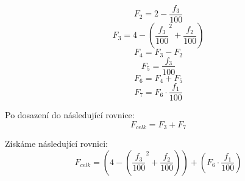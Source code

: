 \begin{equation}
    \label{eqn:1_calculation_7_1}
    F_2 = 2 - \frac{f_3}{100}
\end{equation}
\begin{equation}
    \label{eqn:2_calculation_7_1}
    F_3 = 4 - (\frac{f_3}{100}^2 + \frac{f_2}{100})
\end{equation}
\begin{equation}
    \label{eqn:3_calculation_7_1}
    F_4 = F_3 - F_2
\end{equation}
\begin{equation}
    \label{eqn:4_calculation_7_1}
    F_5 = \frac{f_3}{100}
\end{equation}
\begin{equation}
    \label{eqn:5_calculation_7_1}
    F_6 = F_4 + F_5
\end{equation}
\begin{equation}
    \label{eqn:6_calculation_7_1}
    F_7 = F_6 \cdot \frac{f_1}{100}
\end{equation}

\noindent Po dosazení do následující rovnice:
\begin{equation}
    \label{eqn:7_calculation_7_1}
    F_{celk} = F_3 + F_7
\end{equation}

\noindent Získáme následující rovnici:
\begin{equation}
    \label{eqn:8_calculation_7_1}
    F_{celk} = (4 - (\frac{f_3}{100}^2 + \frac{f_2}{100})) + (F_6 \cdot \frac{f_1}{100})
\end{equation}

